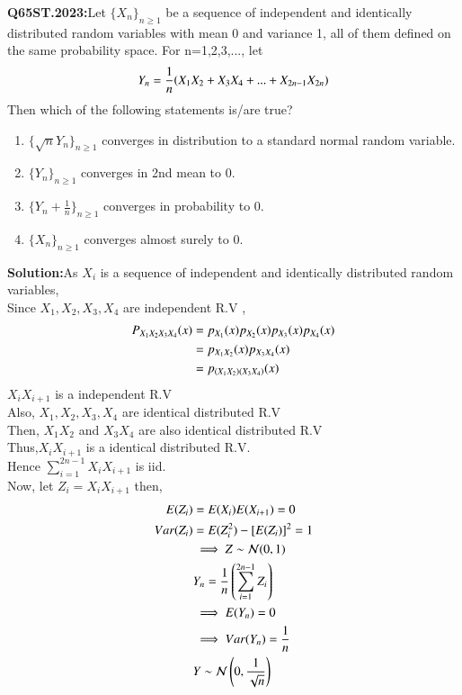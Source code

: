\documentclass[journal,12pt,Twocolumn]{IEEEtran}
\theoremstyle{remark}
\begin{document}

\textbf{Q65ST.2023:}Let $\{X_n\}_{n \geq 1}$ be a sequence of independent and identically distributed random variables with mean 0 and variance 1, all of them defined on the same
probability space. For n=1,2,3,..., let
\begin{align}
Y_n=\frac{1}{n}{\left(X_1X_2+X_3X_4+...+X_{2n-1}X_{2n}\right)} 
\end{align}
Then which of the following statements is/are true? 
\begin{enumerate}[label=(\Alph*)]
\item $\{\sqrt{n}Y_n\}_{n \geq 1}$ converges in distribution to a standard normal random variable.
\item $\{Y_n\}_{n \geq 1}$ converges in 2nd mean to 0.
\item $\{Y_n+\frac{1}{n}\}_{n \geq 1}$ converges in probability to 0.
\item $\{X_n\}_{n \geq 1}$ converges almost surely to 0.
\end{enumerate}
\textbf{Solution:}As $X_i$ is a sequence of independent and identically distributed random variables, \\ 
Since $X_1,X_2,X_3,X_4$ are independent R.V ,
\begin{align}
P_{X_1X_2X_3X_4}(x) &= p_{X_1}(x)p_{X_2}(x)p_{X_3}(x)p_{X_4}(x) \\
&= p_{X_1X_2}(x)p_{X_3X_4}(x) \\
&= p_{\left(X_1X_2\right)\left(X_3X_4\right)}(x) 
\end{align}
$X_iX_{i+1}$ is a independent R.V \\
Also, $X_1,X_2,X_3,X_4$ are identical distributed R.V \\
Then, $X_1X_2$ and $X_3X_4$ are also identical distributed R.V \\
Thus,$X_iX_{i+1}$ is a identical distributed R.V. \\
Hence $\sum_{i=1}^{2n-1} X_iX_{i+1}$ is iid. \\
Now, let $Z_i = X_iX_{i+1}$ then,
\begin{align}
E(Z_i)&=E(X_i)E(X_{i+1})=0 \\ 
Var(Z_i)&=E(Z_i^2)-[E(Z_i)]^2 = 1 \\
&\implies Z \sim \mathcal{N}(0,1) \\
&Y_n=\frac{1}{n}\left(\sum_{i=1}^{2n-1} Z_i\right) \\
&\implies E(Y_n)=0 \\
&\implies Var(Y_n)=\frac{1}{n} \\
&\label{65/st/23:eq11} Y \sim \mathcal{N}\left(0,\frac{1}{\sqrt{n}}\right)
\end{align} 
\end{document}
